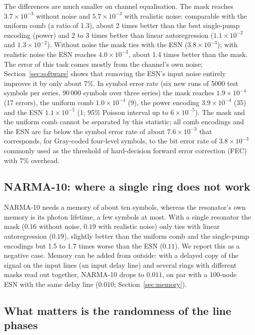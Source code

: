The differences are much smaller on channel equalisation. The mask reaches $3.7\times10^{-3}$ without noise and
$5.7\times10^{-3}$ with realistic noise: comparable with the uniform comb (a ratio of 1.3), about 2 times better than the best
single-pump encoding (power) and 2 to 3 times better than linear autoregression ($1.1\times10^{-2}$ and $1.3\times10^{-2}$).
Without noise the mask ties with the ESN ($3.8\times10^{-3}$); with realistic noise the ESN reaches $4.0\times10^{-3}$, about 1.4
times better than the mask. The error of this task comes mostly from the channel's own noise; Section~\ref{sec:software} shows that
removing the ESN's input noise entirely improves it by only about 7\%.
In symbol error rate (six new runs of 5000 test symbols per series, 90\,000 symbols over three series) the mask reaches
$1.9\times10^{-4}$ (17 errors), the uniform comb $1.0\times10^{-4}$ (9), the power encoding $3.9\times10^{-4}$ (35) and the ESN
$1.1\times10^{-5}$ (1; 95\% Poisson interval up to $6\times10^{-5}$). The mask and the uniform comb cannot be separated by this
statistic; all comb encodings and the ESN are far below the symbol error rate of about $7.6\times10^{-3}$ that corresponds, for Gray-coded
four-level symbols, to the bit error rate of $3.8\times10^{-3}$ commonly used as the threshold of hard-decision forward error
correction (FEC) with 7\% overhead.

\subsection{NARMA-10: where a single ring does not work}

NARMA-10 needs a memory of about ten symbols, whereas the resonator's own memory is its photon lifetime, a few symbols at most.
With a single resonator the mask ($0.16$ without noise, $0.19$ with realistic noise) only ties with linear autoregression ($0.19$),
slightly better than the uniform comb and the single-pump encodings but 1.5 to 1.7 times worse than the ESN ($0.11$). We report this
as a negative case. Memory can be added from outside: with a delayed copy of the signal on the input lines (an input delay line)
and several rings with different masks read out together, NARMA-10 drops to $0.011$, on par with a 100-node ESN with the same delay
line ($0.010$; Section~\ref{sec:memory}).

\subsection{What matters is the randomness of the line phases}\label{sec:ablation}

